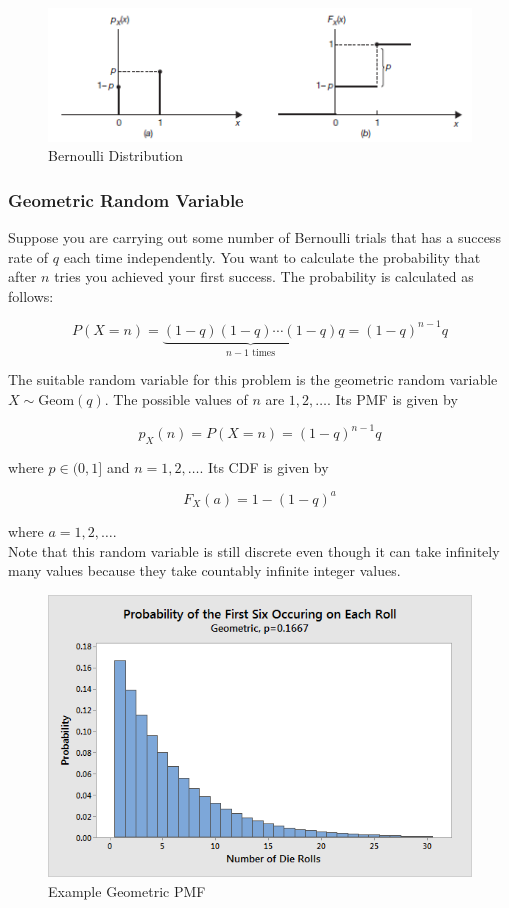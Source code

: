 \documentclass[12pt, a4paper]{article}
\begin{document}
\begin{figure}[H]
\centering
\includegraphics[width=120mm]{6.png}
\caption{Bernoulli Distribution}
\end{figure}

\subsubsection{Geometric Random Variable}

Suppose you are carrying out some number of Bernoulli trials that has a success rate of $q$ each time independently. You want to calculate the probability that after $n$ tries you achieved your first success. The probability is calculated as follows:

$$P(X=n)= \underbrace{ (1-q)(1-q) \cdots (1-q) }_{ \text{$n-1$ times} } q=(1-q)^{n-1} q$$

The suitable random variable for this problem is the geometric random variable $X \sim \text{Geom} (q)$. The possible values of $n$ are $1, 2, \dots$. Its PMF is given by

$$p_X(n)=P(X=n)=(1-q)^{n-1} q$$

where $p\in(0,1]$ and $n=1, 2,\dots$. Its CDF is given by

$$F_X(a)=1-(1-q)^a$$

where $a=1, 2,\dots$. \\

Note that this random variable is still discrete even though it can take infinitely many values because they take countably infinite integer values.

\begin{figure}[H]
\centering
\includegraphics[width=120mm]{7.png}
\caption{Example Geometric PMF}
\end{figure}
\end{document}
